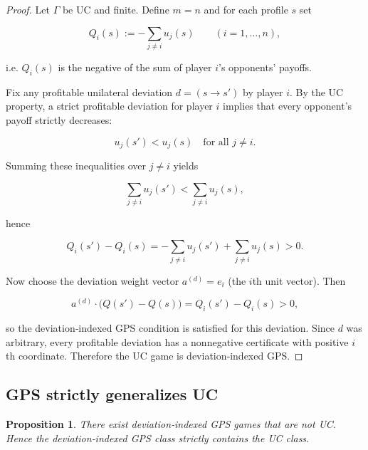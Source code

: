 \documentclass[11pt]{article}
\newtheorem{proposition}[theorem]{Proposition}
\begin{document}
\begin{proof}
Let $\Gamma$ be UC and finite. Define $m=n$ and for each profile $s$ set


\[
Q_i(s):=-\sum_{j\ne i} u_j(s)\qquad(i=1,\dots,n),
\]


i.e. $Q_i(s)$ is the negative of the sum of player \(i\)'s opponents' payoffs.

Fix any profitable unilateral deviation $d=(s\to s')$ by player $i$. By the UC property, a strict profitable deviation for player $i$ implies that every opponent's payoff strictly decreases:


\[
u_j(s')<u_j(s)\quad\text{for all }j\ne i.
\]


Summing these inequalities over $j\ne i$ yields


\[
\sum_{j\ne i} u_j(s') < \sum_{j\ne i} u_j(s),
\]


hence


\[
Q_i(s')-Q_i(s) = -\sum_{j\ne i} u_j(s') + \sum_{j\ne i} u_j(s) > 0.
\]


Now choose the deviation weight vector $a^{(d)}=e_i$ (the $i$th unit vector). Then


\[
a^{(d)}\cdot\big(Q(s')-Q(s)\big)=Q_i(s')-Q_i(s)>0,
\]


so the deviation‑indexed GPS condition is satisfied for this deviation. Since $d$ was arbitrary, every profitable deviation has a nonnegative certificate with positive $i$th coordinate. Therefore the UC game is deviation‑indexed GPS.
\end{proof}

\subsection{GPS strictly generalizes UC}

\begin{proposition}\label{prop:GPS-broader}
There exist deviation‑indexed GPS games that are not UC. Hence the deviation‑indexed GPS class strictly contains the UC class.
\end{proposition}
\end{document}
